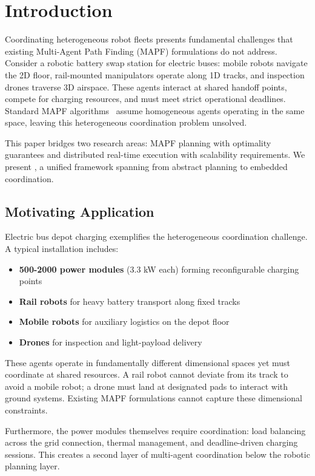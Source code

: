 \section{Introduction}
\label{sec:intro}

Coordinating heterogeneous robot fleets presents fundamental challenges that existing Multi-Agent Path Finding (MAPF) formulations do not address. Consider a robotic battery swap station for electric buses: mobile robots navigate the 2D floor, rail-mounted manipulators operate along 1D tracks, and inspection drones traverse 3D airspace. These agents interact at shared handoff points, compete for charging resources, and must meet strict operational deadlines. Standard MAPF algorithms~\cite{sharon2015cbs,stern2019mapf} assume homogeneous agents operating in the same space, leaving this heterogeneous coordination problem unsolved.

This paper bridges two research areas: MAPF planning with optimality guarantees and distributed real-time execution with scalability requirements. We present \mapfhet{}, a unified framework spanning from abstract planning to embedded coordination.

\subsection{Motivating Application}

Electric bus depot charging exemplifies the heterogeneous coordination challenge. A typical installation includes:
\begin{itemize}
    \item \textbf{500-2000 power modules} (3.3 kW each) forming reconfigurable charging points
    \item \textbf{Rail robots} for heavy battery transport along fixed tracks
    \item \textbf{Mobile robots} for auxiliary logistics on the depot floor
    \item \textbf{Drones} for inspection and light-payload delivery
\end{itemize}

These agents operate in fundamentally different dimensional spaces yet must coordinate at shared resources. A rail robot cannot deviate from its track to avoid a mobile robot; a drone must land at designated pads to interact with ground systems. Existing MAPF formulations cannot capture these dimensional constraints.

Furthermore, the power modules themselves require coordination: load balancing across the grid connection, thermal management, and deadline-driven charging sessions. This creates a second layer of multi-agent coordination below the robotic planning layer.

